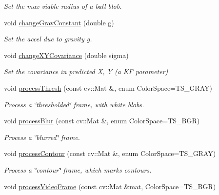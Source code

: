 \begin{DoxyCompactItemize}
\begin{DoxyCompactList}\small\item\em Set the max viable radius of a ball blob. \end{DoxyCompactList}\item 
void \hyperlink{classTrackingStream_a1be9d5219a50b43f019de7ce2dcc1898}{change\+Grav\+Constant} (double g)
\begin{DoxyCompactList}\small\item\em Set the accel due to gravity g. \end{DoxyCompactList}\item 
void \hyperlink{classTrackingStream_ae32a3ab93ae95a448ed82e7142687cdc}{change\+X\+Y\+Covariance} (double sigma)
\begin{DoxyCompactList}\small\item\em Set the covariance in predicted X, Y (a KF parameter) \end{DoxyCompactList}\item 
void \hyperlink{classTrackingStream_affeb1596b199492467965aa556c5d933}{process\+Thresh} (const cv\+::\+Mat \&, enum Color\+Space=T\+S\+\_\+\+G\+R\+AY)\hypertarget{classTrackingStream_affeb1596b199492467965aa556c5d933}{}\label{classTrackingStream_affeb1596b199492467965aa556c5d933}

\begin{DoxyCompactList}\small\item\em Process a \char`\"{}thresholded\char`\"{} frame, with white blobs. \end{DoxyCompactList}\item 
void \hyperlink{classTrackingStream_a7b790a7d4ef7265dfb2ab0a97ee73228}{process\+Blur} (const cv\+::\+Mat \&, enum Color\+Space=T\+S\+\_\+\+B\+GR)\hypertarget{classTrackingStream_a7b790a7d4ef7265dfb2ab0a97ee73228}{}\label{classTrackingStream_a7b790a7d4ef7265dfb2ab0a97ee73228}

\begin{DoxyCompactList}\small\item\em Process a \char`\"{}blurred\char`\"{} frame. \end{DoxyCompactList}\item 
void \hyperlink{classTrackingStream_acd9337e639bb763b1bab7c717eaabcc8}{process\+Contour} (const cv\+::\+Mat \&, enum Color\+Space=T\+S\+\_\+\+G\+R\+AY)\hypertarget{classTrackingStream_acd9337e639bb763b1bab7c717eaabcc8}{}\label{classTrackingStream_acd9337e639bb763b1bab7c717eaabcc8}

\begin{DoxyCompactList}\small\item\em Process a \char`\"{}contour\char`\"{} frame, which marks contours. \end{DoxyCompactList}\item 
void \hyperlink{classTrackingStream_a4b855ad6d3134cd120fd258cb2923858}{process\+Video\+Frame} (const cv\+::\+Mat \&mat, Color\+Space=T\+S\+\_\+\+B\+GR)\hypertarget{classTrackingStream_a4b855ad6d3134cd120fd258cb2923858}{}\label{classTrackingStream_a4b855ad6d3134cd120fd258cb2923858}


\end{DoxyCompactItemize}
